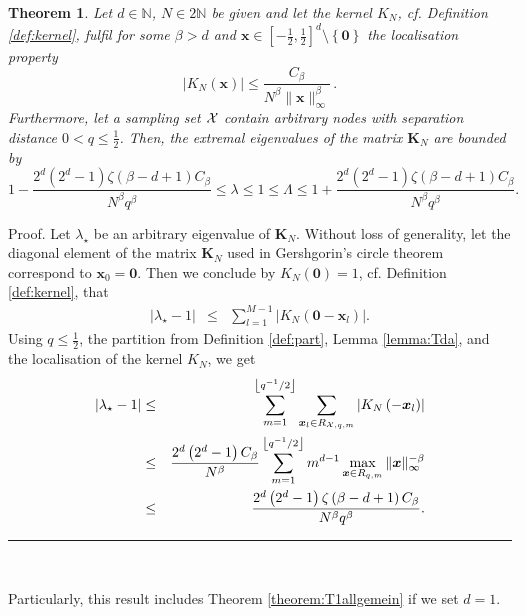 \documentclass[11pt,a4paper,bibtotoc]{scrartcl}
\def\N{\mathbb{N}}
\newcommand{\zb}[1]{\ensuremath{\boldsymbol{#1}}}
\newcommand{\Boxgl}{\par\vspace{-5ex} \hspace*{0ex} \hfill
  \rule{1.5ex}{1.5ex} \\ \goodbreak\goodbreak}
\newtheorem{theorem}{Theorem}[section]
\newenvironment{Theorem}{\goodbreak \begin{theorem}\sl}{\end{theorem}}
\numberwithin{equation}{section}
\numberwithin{table}{section}
\numberwithin{figure}{section}
\begin{document}
\begin{Theorem} \label{theorem:Tdallgemein}
  Let $d\in\N$, $N \in 2\mathbb{N}$ be given and let the kernel $K_N$,
  cf. Definition \ref{def:kernel}, fulfil for some $\beta> d$ and
  $\zb x\in\left[-\frac{1}{2},\frac{1}{2}\right]^d\setminus\left\{\zb
  0\right\}$ the localisation property
  \begin{equation*}
    \left|K_N\left(\zb x\right)\right| \le \frac{C_{\beta}}
    {N^{\beta}\|\zb x\|_{\infty}^{\beta}}\,.
  \end{equation*}
  Furthermore, let a sampling set ${\cal X}$ contain arbitrary nodes with
  separation distance $0<q\le \frac{1}{2}$.
  Then, the extremal eigenvalues of the matrix $\zb K_N$ are bounded by
  \begin{equation*}
    1 - \frac{2^d\left(2^d-1\right) \zeta\left(\beta-d+1\right)
    C_{\beta}}{N^{\beta} q^{\beta}} \le \lambda \le 1 \le \Lambda \le
    1 + \frac{2^d\left(2^d-1\right) \zeta\left(\beta-d+1\right)
    C_{\beta}}{N^{\beta} q^{\beta}}.
  \end{equation*}
\end{Theorem}

Proof. 
Let $\lambda_{\star}$ be an arbitrary eigenvalue of $\zb K_N$.
Without loss of generality, let the diagonal element of the matrix $\zb K_N$
used in Gershgorin's circle theorem correspond to $\zb x_0=\zb 0$.
Then we conclude by $K_N(\zb 0)=1$, cf. Definition \ref{def:kernel}, that
\begin{eqnarray*}
  \left|\lambda_{\star}-1\right| &\le& \sum\limits_{l=1}^{M-1} \left|
    K_N\left(\zb 0-\zb x_l\right)\right|.
\end{eqnarray*}
Using $q\le\frac{1}{2}$, the partition from Definition \ref{def:part}, Lemma
\ref{lemma:Tda}, and the localisation of the kernel $K_N$, we get
 \begin{eqnarray*}
 \left|\lambda_{\star}-1\right|
     &\le&\sum\limits_{m=1}^{\left\lfloor q^{-1}/2 \right\rfloor}
     \sum\limits_{\zb x_l \in R_{{\cal X},q,m}} 
     \left|K_N\left(-\zb x_l\right)\right|\\
     &\le& \frac{2^d\left(2^d-1\right) C_{\beta}}{N^{\beta}}
     \sum\limits_{m=1}^{\left\lfloor q^{-1}/2 \right\rfloor} m^{d-1}
     \max\limits_{\zb x \in R_{q,m}} \|\zb x\|_{\infty}^{-\beta}\\ 
     &\le& \frac{2^d\left(2^d-1\right) \zeta\left(\beta-d+1\right)
     C_{\beta}}{N^{\beta} q^{\beta}}.
   \end{eqnarray*}
\Boxgl

Particularly, this result includes Theorem \ref{theorem:T1allgemein} if we set
$d=1$. 
\end{document}
